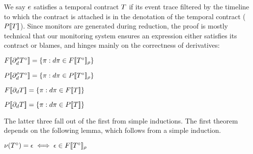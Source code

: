 We say $e$ satisfies a temporal contract $T$ if its event trace filtered by the timeline to which the contract is attached is in the denotation of the temporal contract ($P[\![ T ]\!]$).
%
Since monitors are generated during reduction, the proof is mostly technical that our monitoring system ensures an expression either satisfies its contract or blames, and hinges mainly on the correctness of derivatives:
%

\begin{theorem}[Full]\label{thm:full}
 $F[\![ \partial_{d}^{\rho}{T^\circ} ]\!] = \left\{\pi : d\pi \in F[\![ T^\circ ]\!]_{\rho}\right\}$
\end{theorem}

\begin{theorem}[Partial]\label{thm:partial}
 $P[\![ \partial_{d}^{\rho}{T^\circ} ]\!] = \left\{\pi : d\pi \in P[\![ T^\circ ]\!]_{\rho}\right\}$
\end{theorem}

\begin{theorem}\label{thm:top-full}
 $F[\![ \partial_{d}{T} ]\!] = \left\{\pi : d\pi \in F[\![ T ]\!]\right\}$
\end{theorem}

\begin{theorem}\label{thm:top-partial}
 $P[\![ \partial_{d}{T} ]\!] = \left\{\pi : d\pi \in P[\![ T ]\!]\right\}$
\end{theorem}

The latter three fall out of the first from simple inductions.
%
The first theorem depends on the following lemma, which follows from a simple induction.

\begin{lemma}[Nullability]\label{lem:nullability}
  $\nu(T^\circ) = \epsilon \iff \epsilon \in F[\![ T^\circ ]\!]_{\rho}$
\end{lemma}

